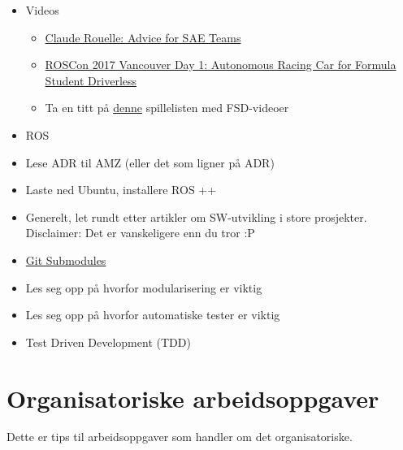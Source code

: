 \begin{itemize}
	\item Videos
	\begin{itemize}
		\item \href{https://vimeo.com/41854831}{Claude Rouelle: Advice for SAE Teams}
		\item \href{https://vimeo.com/236115599}{ROSCon 2017 Vancouver Day 1: Autonomous Racing Car for Formula Student Driverless}
		\item Ta en titt på \href{https://www.youtube.com/watch?v=FbKLE7uar9Y&list=PLzugcz36-zVEIKpvXdxbok9p3uxZvYYFN}{denne} spillelisten med FSD-videoer
	\end{itemize}
	\item ROS
	\item Lese ADR til AMZ (eller det som ligner på ADR)
	\item Laste ned Ubuntu, installere ROS ++
	\item Generelt, let rundt etter artikler om SW-utvikling i store prosjekter. \\ \tab
	Disclaimer: Det er vanskeligere enn du tror :P 
	\item \href{https://medium.com/@porteneuve/mastering-git-submodules-34c65e940407}{Git Submodules}
	\item Les seg opp på hvorfor modularisering er viktig
	\item Les seg opp på hvorfor automatiske tester er viktig
	\item Test Driven Development (TDD)

\end{itemize}

\section{Organisatoriske arbeidsoppgaver}
Dette er tips til arbeidsoppgaver som handler om det organisatoriske. 

